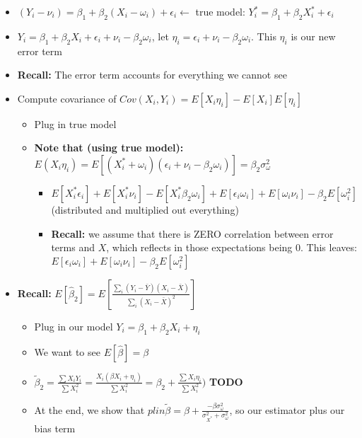 \documentclass[10pt, oneside]{article}
\begin{document}
\begin{itemize}
\begin{itemize}
        \item $(Y_i - \nu_i ) = \beta_1 + \beta_2(X_i -\omega_i) + \epsilon_i \leftarrow $ true model: $Y^*_i = \beta_1 + \beta_2 X_i^* + \epsilon_i$
        \item $Y_i = \beta_1 + \beta_2 X_i + \epsilon_i + \nu_i - \beta_2 \omega_i$, let $\eta_i = \epsilon_i + \nu_i - \beta_2 \omega_i$. This $\eta_i$ is our new error term
        \item \textbf{Recall:} The error term accounts for everything we cannot see
        \item Compute covariance of $Cov(X_i,Y_i) = E[X_i\eta_i] - E[X_i] E[\eta_i]$
        \begin{itemize}
            \item Plug in true model
            \item \textbf{Note that (using true model):} $E(X_i \eta_i) = E[(X_i^* + \omega_i )(\epsilon_i + \nu _i - \beta_2 \omega_i)] = \beta_2 \sigma_\omega^2$
            \begin{itemize}
                \item $E[X_i^* \epsilon_i] + E[X_i^* \nu_i ] - E[X_i^* \beta_2 \omega_i] + E[\epsilon_i \omega_i] + E[\omega_i \nu_i] - \beta_2 E[\omega_i^2]$ (distributed and multiplied out everything)
                \item \textbf{Recall:} we assume that there is ZERO correlation between error terms and $X$, which reflects in those expectations being 0. This leaves: $E[\epsilon_i \omega_i] + E[\omega_i \nu_i] - \beta_2 E[\omega_i ^2]$
            \end{itemize}
        \end{itemize}
        \item \textbf{Recall:} $E[\hat \beta_2] = E\left[\frac{\sum_i (Y_i - \bar Y)(X_i - \bar X)}{\sum_i (X_i - \bar X)^2}\right]$
        \begin{itemize}
            \item Plug in our model $Y_i = \beta_1 + \beta_2 X_i + \eta_i$
            \item We want to see $E[\hat \beta] = \beta$
            \item $\tilde \beta_2 = \frac{\sum X_i Y_i }{\sum X_i^2} = \frac{X_i (\beta X_i + \eta_i)}{\sum X_i^2} = \beta_2 + \frac{\sum X_i \eta_i}{\sum X_i ^2}) $ \textbf{TODO}
            \item At the end, we show that $plin \tilde \beta = \beta + \frac{-\beta \sigma^2 _\omega}{\sigma^2 _{X^*} + \sigma^2 _\omega}$, so our estimator plus our bias term

\end{itemize}
\end{itemize}
\end{itemize}
\end{document}
